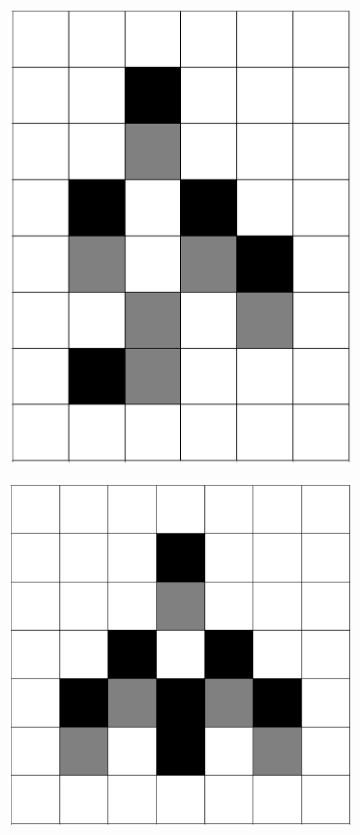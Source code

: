 \documentclass[12pt]{article}
\numberwithin{figure}{section} %
\begin{document}
\begin{figure}[H]
\begin{subfigure}{0.18\textwidth}
     \includegraphics[angle=270,width=\linewidth]{Section4/8.2}
     \subcaption{}
   \end{subfigure}
           \begin{subfigure}{0.18\textwidth}
     \centering
     \includegraphics[angle=270,width=\linewidth]{Section4/8.3}

\end{subfigure}
\end{figure}
\end{document}
